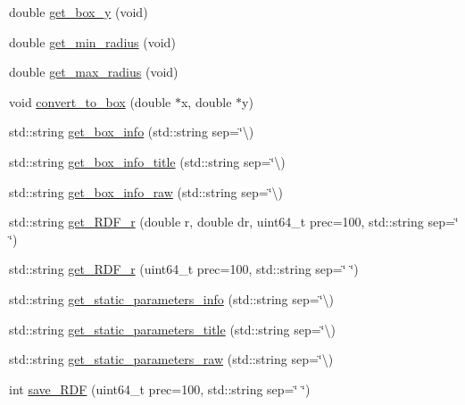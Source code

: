 \begin{DoxyCompactItemize}
\item 
double \mbox{\hyperlink{classClassSiec_a6670e040d5bd507051671b8bd856c7d0}{get\+\_\+box\+\_\+y}} (void)
\item 
double \mbox{\hyperlink{classClassSiec_ab17d2e44f433cb4aec5d965b158a60a1}{get\+\_\+min\+\_\+radius}} (void)
\item 
double \mbox{\hyperlink{classClassSiec_a078c088fe48696423cc5c6c429d45eab}{get\+\_\+max\+\_\+radius}} (void)
\item 
void \mbox{\hyperlink{classClassSiec_ab883e160c0a8878ce20b8a27fea9b65f}{convert\+\_\+to\+\_\+box}} (double $\ast$x, double $\ast$y)
\item 
std\+::string \mbox{\hyperlink{classClassSiec_a5228f0e683612ae0a947f77a2bb7d2c9}{get\+\_\+box\+\_\+info}} (std\+::string sep=\char`\"{}\textbackslash{})
\item 
std\+::string \mbox{\hyperlink{classClassSiec_a653414664f006ee8cbfb8d101c8e8e62}{get\+\_\+box\+\_\+info\+\_\+title}} (std\+::string sep=\char`\"{}\textbackslash{})
\item 
std\+::string \mbox{\hyperlink{classClassSiec_a1e4fd45f66e131050359072b706f7608}{get\+\_\+box\+\_\+info\+\_\+raw}} (std\+::string sep=\char`\"{}\textbackslash{})
\item 
std\+::string \mbox{\hyperlink{classClassSiec_a609cc786246741388e18ed50c0165388}{get\+\_\+\+R\+D\+F\+\_\+r}} (double r, double dr, uint64\+\_\+t prec=100, std\+::string sep=\char`\"{} \char`\"{})
\item 
std\+::string \mbox{\hyperlink{classClassSiec_aad7c55f1dfa1b5bca25fc39e0b509304}{get\+\_\+\+R\+D\+F\+\_\+r}} (uint64\+\_\+t prec=100, std\+::string sep=\char`\"{} \char`\"{})
\item 
std\+::string \mbox{\hyperlink{classClassSiec_aaf3b24bc73d268f151acdff6351214e0}{get\+\_\+static\+\_\+parameters\+\_\+info}} (std\+::string sep=\char`\"{}\textbackslash{})
\item 
std\+::string \mbox{\hyperlink{classClassSiec_a1fcb70fc39cb91fe5b5382c7911de316}{get\+\_\+static\+\_\+parameters\+\_\+title}} (std\+::string sep=\char`\"{}\textbackslash{})
\item 
std\+::string \mbox{\hyperlink{classClassSiec_abed8d28e81524a99ab325569db15bb36}{get\+\_\+static\+\_\+parameters\+\_\+raw}} (std\+::string sep=\char`\"{}\textbackslash{})
\item 
int \mbox{\hyperlink{classClassSiec_a984c7c1d77c9cf78b6254529088028a4}{save\+\_\+\+R\+DF}} (uint64\+\_\+t prec=100, std\+::string sep=\char`\"{} \char`\"{})
\item 

\end{DoxyCompactItemize}
